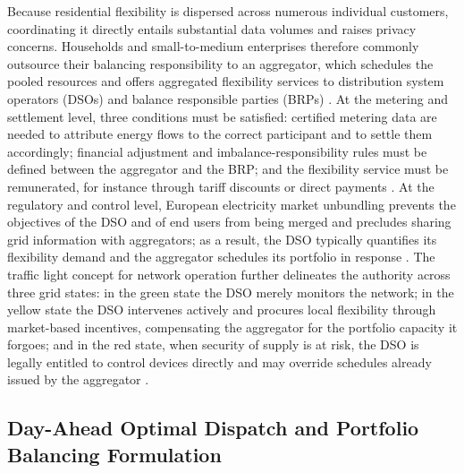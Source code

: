 \documentclass[conference]{IEEEtran}
\begin{document}
Because residential flexibility is dispersed across numerous individual customers, coordinating it directly entails substantial data volumes and raises privacy concerns. Households and small-to-medium enterprises therefore commonly outsource their balancing responsibility to an aggregator, which schedules the pooled resources and offers aggregated flexibility services to distribution system operators (DSOs) and balance responsible parties (BRPs) \cite{Diekerhof2018,OlivellaRosell2020}. At the metering and settlement level, three conditions must be satisfied: certified metering data are needed to attribute energy flows to the correct participant and to settle them accordingly; financial adjustment and imbalance-responsibility rules must be defined between the aggregator and the BRP; and the flexibility service must be remunerated, for instance through tariff discounts or direct payments \cite{Diekerhof2018}. At the regulatory and control level, European electricity market unbundling prevents the objectives of the DSO and of end users from being merged and precludes sharing grid information with aggregators; as a result, the DSO typically quantifies its flexibility demand and the aggregator schedules its portfolio in response \cite{OlivellaRosell2020}. The traffic light concept for network operation further delineates the authority across three grid states: in the green state the DSO merely monitors the network; in the yellow state the DSO intervenes actively and procures local flexibility through market-based incentives, compensating the aggregator for the portfolio capacity it forgoes; and in the red state, when security of supply is at risk, the DSO is legally entitled to control devices directly and may override schedules already issued by the aggregator \cite{Diekerhof2018}.

\subsection{Day-Ahead Optimal Dispatch and Portfolio Balancing Formulation}
\label{sec:formulation}
\end{document}
